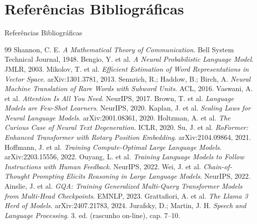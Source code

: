 \documentclass[aspectratio=169]{beamer}
\begin{document}
\section{Referências Bibliográficas}
\begin{frame}[shrink=12]{Referências Bibliográficas}
    \begin{thebibliography}{99}\footnotesize
         Shannon, C. E. \textit{A Mathematical Theory of Communication}. Bell System Technical Journal, 1948.
         Bengio, Y. et al. \textit{A Neural Probabilistic Language Model}. JMLR, 2003.
         Mikolov, T. et al. \textit{Efficient Estimation of Word Representations in Vector Space}. arXiv:1301.3781, 2013.
         Sennrich, R.; Haddow, B.; Birch, A. \textit{Neural Machine Translation of Rare Words with Subword Units}. ACL, 2016.
         Vaswani, A. et al. \textit{Attention Is All You Need}. NeurIPS, 2017.
         Brown, T. et al. \textit{Language Models are Few-Shot Learners}. NeurIPS, 2020.
         Kaplan, J. et al. \textit{Scaling Laws for Neural Language Models}. arXiv:2001.08361, 2020.
         Holtzman, A. et al. \textit{The Curious Case of Neural Text Degeneration}. ICLR, 2020.
         Su, J. et al. \textit{RoFormer: Enhanced Transformer with Rotary Position Embedding}. arXiv:2104.09864, 2021.
         Hoffmann, J. et al. \textit{Training Compute-Optimal Large Language Models}. arXiv:2203.15556, 2022.
         Ouyang, L. et al. \textit{Training Language Models to Follow Instructions with Human Feedback}. NeurIPS, 2022.
         Wei, J. et al. \textit{Chain-of-Thought Prompting Elicits Reasoning in Large Language Models}. NeurIPS, 2022.
         Ainslie, J. et al. \textit{GQA: Training Generalized Multi-Query Transformer Models from Multi-Head Checkpoints}. EMNLP, 2023.
         Grattafiori, A. et al. \textit{The Llama 3 Herd of Models}. arXiv:2407.21783, 2024.
         Jurafsky, D.; Martin, J. H. \textit{Speech and Language Processing}. 3. ed. (rascunho on-line), cap. 7--10.
    \end{thebibliography}
\end{frame}

\begin{frame}
    \titlepage
\end{frame}
\end{document}
